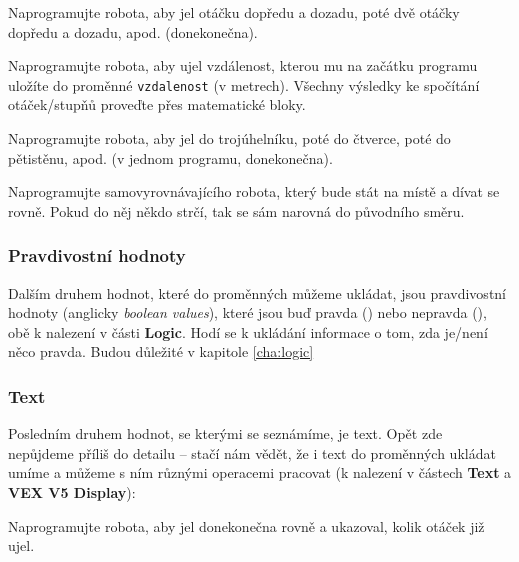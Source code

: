 \documentclass[../main.tex]{subfiles}
\begin{document}
	\begin{question}
		Naprogramujte robota, aby jel otáčku dopředu a dozadu, poté dvě otáčky dopředu a dozadu, apod. (donekonečna).
	\end{question}

	\begin{question}
		Naprogramujte robota, aby ujel vzdálenost, kterou mu na začátku programu uložíte do proměnné \texttt{vzdalenost} (v metrech). Všechny výsledky ke spočítání otáček/stupňů proveďte přes matematické bloky.
	\end{question}

	\begin{question*}
		Naprogramujte robota, aby jel do trojúhelníku, poté do čtverce, poté do pětistěnu, apod. (v jednom programu, donekonečna).
	\end{question*}

	\begin{question*}
		Naprogramujte samovyrovnávajícího robota, který bude stát na místě a dívat se rovně. Pokud do něj někdo strčí, tak se sám narovná do původního směru.
	\end{question*}

	\subsubsection{Pravdivostní hodnoty}
	Dalším druhem hodnot, které do proměnných můžeme ukládat, jsou pravdivostní hodnoty (anglicky \textit{boolean values}), které jsou buď pravda (\blockLogicTrueImageBaseline) nebo nepravda (\blockLogicTrueImageBaseline), obě k nalezení v části \textbf{Logic}. Hodí se k ukládání informace o tom, zda je/není něco pravda. Budou důležité v kapitole \ref{cha:logic}

	\subsubsection{Text}
	Posledním druhem hodnot, se kterými se seznámíme, je text. Opět zde nepůjdeme příliš do detailu -- stačí nám vědět, že i text do proměnných ukládat umíme a můžeme s ním různými operacemi pracovat (k nalezení v částech \textbf{Text} a \textbf{VEX V5 Display}):

	\begin{itemize}
		\blockString
		\blockDisplayPrint
		\blockDisplayClear
	\end{itemize}

	\begin{question}
		Naprogramujte robota, aby jel donekonečna rovně a ukazoval, kolik otáček již ujel.
	\end{question}
\end{document}

